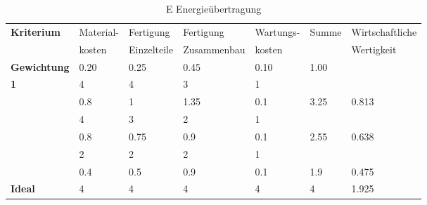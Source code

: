 \documentclass[10pt,a4paper]{article}
\begin{document}
\begin{table}[h!]
    \centering
    \hspace*{0in}
    \begin{tabular}{>{\bfseries}p{2cm} p{2.2cm} p{2cm} p{2cm} p{2.5cm} p{2cm} p{2cm}}
        \toprule
        Kriterium  & Material- & Fertigung   & Fertigung   & Wartungs- & Summe & Wirtschaftliche \\
                   & kosten    & Einzelteile & Zusammenbau & kosten    &       & Wertigkeit      \\
        \midrule
        Gewichtung & 0.20      & 0.25        & 0.45        & 0.10      & 1.00  &                 \\
        \midrule
        1          & 4         & 4           & 3           & 1         &       &                 \\
                   & 0.8       & 1           & 1.35        & 0.1       & 3.25  & 0.813           \\
        \addlinespace
        2          & 4         & 3           & 2           & 1         &       &                 \\
                   & 0.8       & 0.75        & 0.9         & 0.1       & 2.55  & 0.638           \\
        \addlinespace
        3          & 2         & 2           & 2           & 1         &       &                 \\
                   & 0.4       & 0.5         & 0.9         & 0.1       & 1.9   & 0.475           \\
        \addlinespace
        Ideal      & 4         & 4           & 4           & 4         & 4     & 1.925           \\
        \bottomrule
    \end{tabular}
    \caption{E Energieübertragung}
    \label{tab:energieuebertragung}
\end{table}
\end{document}
